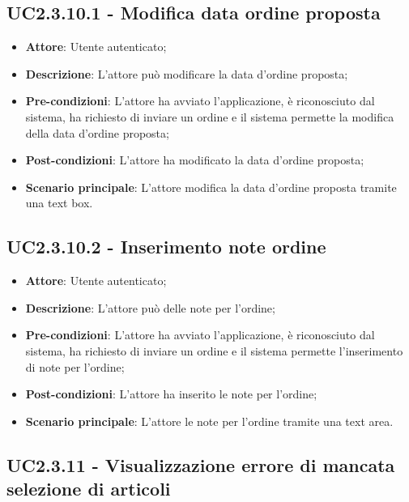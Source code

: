\subsection{UC2.3.10.1 - Modifica data ordine proposta}

\begin{itemize}
	\item \textbf{Attore}: Utente autenticato;
	\item \textbf{Descrizione}: L'attore può modificare la data d'ordine proposta;
	\item \textbf{Pre-condizioni}: L'attore ha avviato l'applicazione, è riconosciuto dal sistema, ha richiesto di inviare un ordine e il sistema permette la modifica della data d'ordine proposta;
	\item \textbf{Post-condizioni}: L'attore ha modificato la data d'ordine proposta;
	\item \textbf{Scenario principale}: L'attore modifica la data d'ordine proposta tramite una text box.
\end{itemize}

\subsection{UC2.3.10.2 - Inserimento note ordine}

\begin{itemize}
	\item \textbf{Attore}: Utente autenticato;
	\item \textbf{Descrizione}: L'attore può delle note per l'ordine;
	\item \textbf{Pre-condizioni}: L'attore ha avviato l'applicazione, è riconosciuto dal sistema, ha richiesto di inviare un ordine e il sistema permette l'inserimento di note per l'ordine;
	\item \textbf{Post-condizioni}: L'attore ha inserito le note per l'ordine;
	\item \textbf{Scenario principale}: L'attore le note per l'ordine tramite una text area.
\end{itemize}

\subsection{UC2.3.11 - Visualizzazione errore di mancata selezione di articoli}

